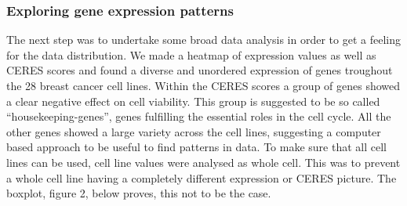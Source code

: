 \documentclass[]{article}
\newenvironment{Shaded}{\begin{snugshade}}{\end{snugshade}}
\newcommand{\CommentTok}[1]{\textcolor[rgb]{0.56,0.35,0.01}{\textit{#1}}}
\newcommand{\ControlFlowTok}[1]{\textcolor[rgb]{0.13,0.29,0.53}{\textbf{#1}}}
\newcommand{\DecValTok}[1]{\textcolor[rgb]{0.00,0.00,0.81}{#1}}
\newcommand{\KeywordTok}[1]{\textcolor[rgb]{0.13,0.29,0.53}{\textbf{#1}}}
\newcommand{\NormalTok}[1]{#1}
\newcommand{\OperatorTok}[1]{\textcolor[rgb]{0.81,0.36,0.00}{\textbf{#1}}}
\newcommand{\StringTok}[1]{\textcolor[rgb]{0.31,0.60,0.02}{#1}}
\begin{document}
\begin{Shaded}
\end{Shaded}

\hypertarget{exploring-gene-expression-patterns}{%
\subsubsection{Exploring gene expression
patterns}\label{exploring-gene-expression-patterns}}

The next step was to undertake some broad data analysis in order to get
a feeling for the data distribution. We made a heatmap of expression
values as well as CERES scores and found a diverse and unordered
expression of genes troughout the 28 breast cancer cell lines. Within
the CERES scores a group of genes showed a clear negative effect on cell
viability. This group is suggested to be so called
``housekeeping-genes'', genes fulfilling the essential roles in the cell
cycle. All the other genes showed a large variety across the cell lines,
suggesting a computer based approach to be useful to find patterns in
data. To make sure that all cell lines can be used, cell line values
were analysed as whole cell. This was to prevent a whole cell line
having a completely different expression or CERES picture. The boxplot,
figure 2, below proves, this not to be the case.
\end{document}

